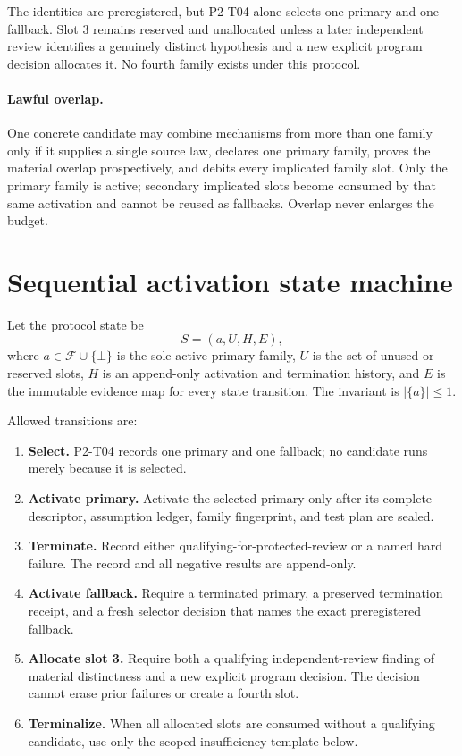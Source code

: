 \documentclass[11pt]{article}
\newcommand{\Fam}{\mathcal{F}}
\begin{document}
The identities are preregistered, but P2-T04 alone selects one primary and one
fallback. Slot 3 remains reserved and unallocated unless a later independent
review identifies a genuinely distinct hypothesis and a new explicit program
decision allocates it. No fourth family exists under this protocol.

\paragraph{Lawful overlap.}
One concrete candidate may combine mechanisms from more than one family only
if it supplies a single source law, declares one primary family, proves the
material overlap prospectively, and debits every implicated family slot. Only
the primary family is active; secondary implicated slots become consumed by
that same activation and cannot be reused as fallbacks. Overlap never enlarges
the budget.

\section{Sequential activation state machine}

Let the protocol state be
\[
 S=(a,U,H,E),
\]
where $a\in\Fam\cup\{\bot\}$ is the sole active primary family, $U$ is the
set of unused or reserved slots, $H$ is an append-only activation and
termination history, and $E$ is the immutable evidence map for every state
transition. The invariant is $|\{a\}|\leq 1$.

Allowed transitions are:
\begin{enumerate}
  \item \textbf{Select.} P2-T04 records one primary and one fallback; no
  candidate runs merely because it is selected.
  \item \textbf{Activate primary.} Activate the selected primary only after
  its complete descriptor, assumption ledger, family fingerprint, and test
  plan are sealed.
  \item \textbf{Terminate.} Record either qualifying-for-protected-review or
  a named hard failure. The record and all negative results are append-only.
  \item \textbf{Activate fallback.} Require a terminated primary, a preserved
  termination receipt, and a fresh selector decision that names the exact
  preregistered fallback.
  \item \textbf{Allocate slot 3.} Require both a qualifying independent-review
  finding of material distinctness and a new explicit program decision. The
  decision cannot erase prior failures or create a fourth slot.
  \item \textbf{Terminalize.} When all allocated slots are consumed without a
  qualifying candidate, use only the scoped insufficiency template below.
\end{enumerate}
\end{document}
